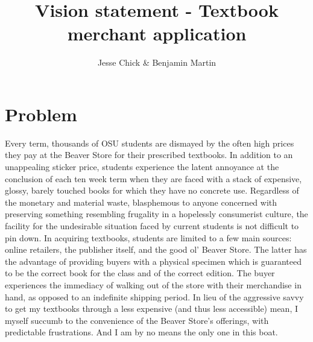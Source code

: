 \documentclass[12pt]{article}
\title{Vision statement - Textbook merchant application}
\author{Jesse Chick \& Benjamin Martin}
\begin{document}
\maketitle
\tableofcontents



\section{Problem}
Every term, thousands of OSU students are dismayed by the often high prices they pay at the Beaver Store for their prescribed textbooks. In addition to an unappealing sticker price, students experience the latent annoyance at the conclusion of each ten week term when they are faced with a stack of expensive, glossy, barely touched books for which they have no concrete use. 
Regardless of the monetary and material waste, blasphemous to anyone concerned with preserving something resembling frugality in a hopelessly consumerist culture, the facility for the undesirable situation faced by current students is not difficult to pin down. In acquiring textbooks, students are limited to a few main sources: online retailers, the publisher itself, and the good ol’ Beaver Store. The latter has the advantage of providing buyers with a physical specimen which is guaranteed to be the correct book for the class and of the correct edition. The buyer experiences the immediacy of walking out of the store with their merchandise in hand, as opposed to an indefinite shipping period. In lieu of the aggressive savvy to get my textbooks through a less expensive (and thus less accessible) mean, I myself succumb to the convenience of the Beaver Store’s offerings, with predictable frustrations. And I am by no means the only one in this boat.
\end{document}
